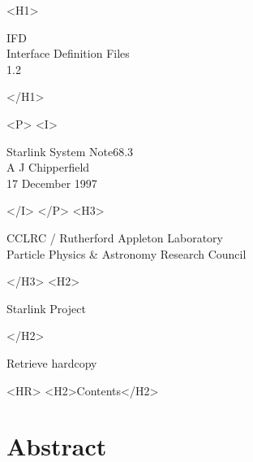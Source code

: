 \documentclass[twoside,11pt]{article}
\newcommand{\stardoccategory}  {Starlink System Note}
\newcommand{\stardocsource}    {sun\stardocnumber}
\newcommand{\stardocnumber}    {68.3}
\newcommand{\stardocauthors}   {A J Chipperfield}
\newcommand{\stardocdate}      {17 December 1997}
\newcommand{\stardoctitle}     {IFD\\[1ex]
                                Interface Definition Files}
\newcommand{\stardocversion}   {1.2}
\newcommand{\stardocmanual}    {}
\newcommand{\htmladdnormallink}[2]{#1}
\newcommand{\htmladdimg}[1]{}
\newcommand{\htmlref}[2]{#1}
\newcommand{\htmladdtonavigation}[1]{}
\newcommand{\xlabel}[1]{}
\newcommand{\latexonlytoc}[0]{\tableofcontents}
\begin{document}
\begin{htmlonly}
   \xlabel{}
   \begin{rawhtml} <H1> \end{rawhtml}
      \stardoctitle\\
      \stardocversion\\
      \stardocmanual
   \begin{rawhtml} </H1> \end{rawhtml}


   \begin{rawhtml} <P> <I> \end{rawhtml}
   \stardoccategory \stardocnumber \\
   \stardocauthors \\
   \stardocdate
   \begin{rawhtml} </I> </P> <H3> \end{rawhtml}
      \htmladdnormallink{CCLRC}{http://www.cclrc.ac.uk} /
      \htmladdnormallink{Rutherford Appleton Laboratory}
                        {http://www.cclrc.ac.uk/ral} \\
      \htmladdnormallink{Particle Physics \& Astronomy Research Council}
                        {http://www.pparc.ac.uk} \\
   \begin{rawhtml} </H3> <H2> \end{rawhtml}
      \htmladdnormallink{Starlink Project}{http://www.starlink.ac.uk/}
   \begin{rawhtml} </H2> \end{rawhtml}
   \htmladdnormallink{\htmladdimg{source.gif} Retrieve hardcopy}
      {http://www.starlink.ac.uk/cgi-bin/hcserver?\stardocsource}\\

  \label{stardoccontents}
  \begin{rawhtml}
    <HR>
    <H2>Contents</H2>
  \end{rawhtml}
  \renewcommand{\latexonlytoc}[0]{}
  \htmladdtonavigation{\htmlref{\htmladdimg{contents_motif.gif}}
        {stardoccontents}}

  \section{\xlabel{abstract}Abstract}
\end{htmlonly}
\end{document}
